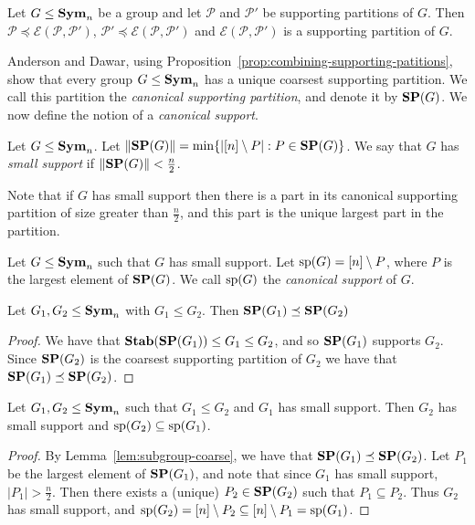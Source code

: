 \documentclass[../paper.tex]{subfiles}
\begin{document}
\begin{prop}
  \label{prop:combining-supporting-patitions}
  Let $G \leq \text{\textbf{Sym}}_n$ be a group and let $\mathcal{P}$ and $\mathcal{P}'$ be
  supporting partitions of $G$. Then $\mathcal{P} \preceq
  \mathcal{E}(\mathcal{P}, \mathcal{P}')$, $ \mathcal{P}' \preceq
  \mathcal{E}(\mathcal{P}, \mathcal{P}')$ and $\mathcal{E}(\mathcal{P},
  \mathcal{P}')$ is a supporting partition of $G$.
\end{prop}

Anderson and Dawar, using Proposition~\ref{prop:combining-supporting-patitions},
show that every group $G \leq \text{\textbf{Sym}}_n$ has a unique coarsest supporting
partition. We call this partition the \emph{canonical supporting partition}, and
denote it by $\text{\textbf{SP}} (G)$. We now define the notion of a \emph{canonical support}.

\begin{definition}
  Let $G \leq \text{\textbf{Sym}}_n$. Let $\| \text{\textbf{SP}}(G) \| = \min \{\vert [n] \setminus P \vert :
  P \in \text{\textbf{SP}}(G) \}$. We say that $G$ has \emph{small support} if $\| \text{\textbf{SP}}(G) \| <
  \frac{n}{2}$.
\end{definition}

Note that if $G$ has small support then there is a part in its canonical
supporting partition of size greater than $\frac{n}{2}$, and this part is the
unique largest part in the partition.

\begin{definition}
  Let $G \leq \text{\textbf{Sym}}_n$ such that $G$ has small support. Let $\text{sp}(G) = [n]
  \setminus P$, where $P$ is the largest element of $\text{\textbf{SP}}(G)$. We call
  $\text{sp}(G)$ the \emph{canonical support} of $G$.
\end{definition}

\begin{lem}\label{lem:subgroup-coarse}
  Let $G_1, G_2 \leq \text{\textbf{Sym}}_n$ with $G_1 \leq G_2$. Then $\text{\textbf{SP}}(G_1) \preceq
  \text{\textbf{SP}}(G_2)$
\end{lem}
\begin{proof}
  We have that $\text{\textbf{Stab}}(\text{\textbf{SP}}(G_1)) \leq G_1 \leq G_2$, and so $\text{\textbf{SP}}(G_1)$ supports
  $G_2$. Since $\text{\textbf{SP}}(G_2)$ is the coarsest supporting partition of $G_2$ we have
  that $\text{\textbf{SP}}(G_1) \preceq \text{\textbf{SP}}(G_2)$.
\end{proof}

\begin{lem}
  Let $G_1, G_2 \leq \text{\textbf{Sym}}_n$ such that $G_1 \leq G_2$ and $G_1$ has small
  support. Then $G_2$ has small support and $\text{sp}(G_2) \subseteq \text{sp}(G_1)$.
  \label{lem:support-containment}
\end{lem}
\begin{proof}
  By Lemma~\ref{lem:subgroup-coarse}, we have that $\text{\textbf{SP}}(G_1) \preceq \text{\textbf{SP}}(G_2)$.
  Let $P_1$ be the largest element of $\text{\textbf{SP}}(G_1)$, and note that since $G_1$ has
  small support, $\vert P_1 \vert > \frac{n}{2}$. Then there exists a (unique)
  $P_2 \in \text{\textbf{SP}}(G_2)$ such that $P_1 \subseteq P_2$. Thus $G_2$ has small
  support, and $\text{sp}(G_2) = [n] \setminus P_2 \subseteq [n] \setminus P_1 =
  \text{sp}(G_1)$.
\end{proof}
\end{document}
